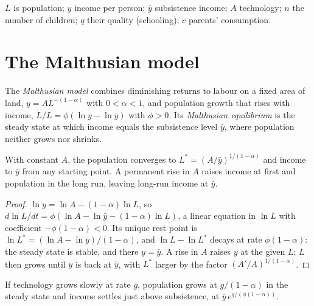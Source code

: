 \begin{notation}\label{not:b3:demographic-transition:symbols}
$L$ is population; $y$ income per person; $\bar y$ subsistence income; $A$ technology; $n$ the
number of children; $q$ their quality (schooling); $c$ parents' consumption.
\end{notation}

\section{The Malthusian model}\label{sec:b3:demographic-transition:malthus}

\begin{definition}\label{def:b3:demographic-transition:malthus}
The \emph{Malthusian model} combines diminishing returns to labour on a fixed area
of land, $y = A L^{-(1 - \alpha)}$ with $0 < \alpha < 1$, and population growth that rises with income,
$\dot L/L = \phi(\ln y - \ln \bar y)$ with $\phi > 0$. Its \emph{Malthusian equilibrium} is the steady state at
which income equals the subsistence level $\bar y$, where population neither grows nor shrinks.
\end{definition}

\begin{proposition}\label{prop:b3:demographic-transition:malthus}
With constant $A$, the population converges to $L^* = (A/\bar y)^{1/(1 - \alpha)}$ and income to $\bar y$ from any starting
point. A permanent rise in $A$ raises income at first and population in the long
run, leaving long-run income at $\bar y$.
\end{proposition}

\begin{proof}
$\ln y = \ln A - (1 - \alpha)\ln L$, so $d\ln L/dt = \phi(\ln A - \ln \bar y - (1 - \alpha)\ln L)$, a linear equation in $\ln L$ with coefficient $-\phi(1 - \alpha) < 0$. Its
unique rest point is $\ln L^* = (\ln A - \ln \bar y)/(1 - \alpha)$, and $\ln L - \ln L^*$ decays at rate $\phi(1 - \alpha)$: the steady state is
stable, and there $y = \bar y$. A rise in $A$ raises $y$ at the given $L$; $L$ then grows
until $y$ is back at $\bar y$, with $L^*$ larger by the factor $(A'/A)^{1/(1 - \alpha)}$.
\end{proof}

If technology grows slowly at rate $g$, population grows at $g/(1 - \alpha)$ in the steady state and
income settles just above subsistence, at $\bar y\, e^{g/(\phi(1 - \alpha))}$.

